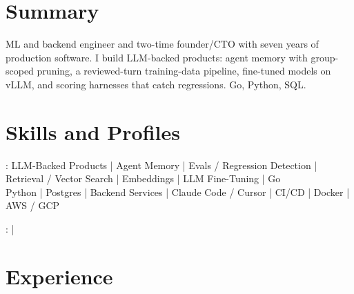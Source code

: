 \documentclass[print]{jack-resume}
\begin{document}
\pagecolor{darkmodeBackground}


\begin{minipage}[t][1cm][t]{.03\textwidth}
    \hfill
\end{minipage}

\section{Summary}
ML and backend engineer and two-time founder/CTO with seven years of production software. I build LLM-backed products: agent memory with group-scoped pruning, a reviewed-turn training-data pipeline, fine-tuned models on vLLM, and scoring harnesses that catch regressions. Go, Python, SQL.
\sectionsep

\section{Skills and Profiles}
:
LLM-Backed Products \hfill | \hfill
Agent Memory \hfill | \hfill
Evals / Regression Detection \hfill | \hfill
Retrieval / Vector Search \hfill | \hfill
Embeddings \hfill | \hfill
LLM Fine-Tuning \hfill | \hfill
Go \\
\hspace{1.0cm} Python \hfill | \hfill
Postgres \hfill | \hfill
Backend Services \hfill | \hfill
Claude Code / Cursor \hfill | \hfill
CI/CD \hfill | \hfill
Docker \hfill | \hfill
AWS / GCP \\

\raggedright{
    :
      \href{https://www.linkedin.com/in/jack-sturtevant/}{ \ExternalLink} |
     \href{https://github.com/jacksturt}{ \ExternalLink}}

\section{Experience}
\end{document}
